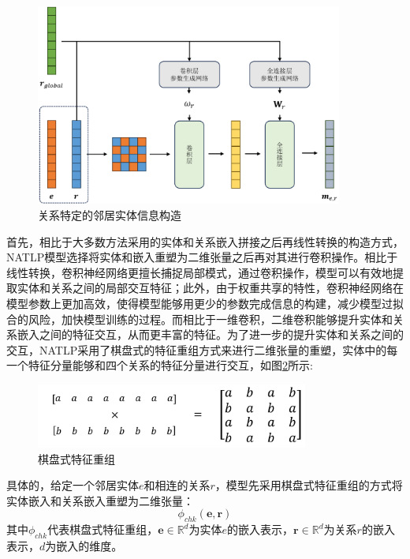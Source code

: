 \begin{figure}[htb]
  \centerline{\includegraphics[width=0.9\textwidth]{pic/build_information.pdf}}
  \caption{关系特定的邻居实体信息构造}
  \label{build_information}
\end{figure}

首先，相比于大多数方法采用的实体和关系嵌入拼接之后再线性转换的构造方式，NATLP模型选择将实体和嵌入重塑为二维张量之后再对其进行卷积操作。相比于线性转换，卷积神经网络更擅长捕捉局部模式，通过卷积操作，模型可以有效地提取实体和关系之间的局部交互特征；此外，由于权重共享的特性，卷积神经网络在模型参数上更加高效，使得模型能够用更少的参数完成信息的构建，减少模型过拟合的风险，加快模型训练的过程。而相比于一维卷积，二维卷积能够提升实体和关系嵌入之间的特征交互，从而更丰富的特征。为了进一步的提升实体和关系之间的交互，NATLP采用了棋盘式的特征重组方式来进行二维张量的重塑，实体中的每一个特征分量能够和四个关系的特征分量进行交互，如图\ref{cross_conv}所示:

\begin{figure}[htb]
  \centerline{\includegraphics[width=0.8\textwidth]{pic/cross_conv.pdf}}
  \caption{棋盘式特征重组}
  \label{cross_conv}
\end{figure}

具体的，给定一个邻居实体$e$和相连的关系$r$，模型先采用棋盘式特征重组的方式将实体嵌入和关系嵌入重塑为二维张量：
\begin{equation}
  \phi_{chk}\left(\boldsymbol{e},\boldsymbol{r}\right) 
\end{equation}
其中$\phi_{chk}$代表棋盘式特征重组，$\boldsymbol{e} \in \mathbb{R} ^d$为实体$e$的嵌入表示，$\boldsymbol{r} \in \mathbb{R}^d$为关系$r$的嵌入表示，$d$为嵌入的维度。

